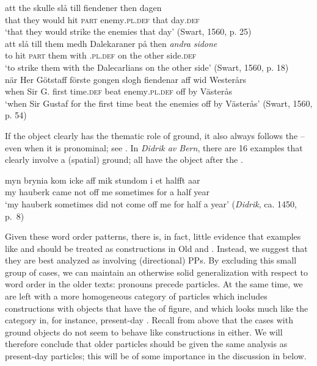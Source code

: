 \documentclass[output=paper]{langscibook}
\begin{document}
\ea\label{ex:lalu:26}
\ea\label{ex:lalu:26a}
\gll  att   the     skulle   slå   till   fiendener         then   dagen\\
    that   they   would   hit  \textsc{part}   enemy\textsc{.pl.def}   that   day\textsc{.def} \\
\glt `that they would strike the enemies that day’ (Swart, 1560, p. 25)\\

\ex\label{ex:lalu:26b}
\gll  att   slå   till   them   medh   Dalekaraner       på   then \textit{andra}   \textit{sidone}\\
    to     hit  \textsc{part}  them   with     \textsc{.pl.def}   on   the other     side.\textsc{def}\\
\glt `to strike them with the Dalecarlians on the other side’ (Swart, 1560, p. 18)\\
\z
\ex\label{ex:lalu:27}
\gll  när    Her  Götstaff   förste    gongen   slogh   fiendenar aff   wid  Westerårs\\
when   Sir  G.       first     time.\textsc{def}   beat     enemy\textsc{.pl.def}  off   by   Västerås\\
\glt `when Sir Gustaf for the first time beat the enemies off by Västerås' (Swart, 1560, p. 54)\\
\z

If the object clearly has the thematic role of ground, it also always follows the  – even when it is pronominal; see . In \textit{Didrik av Bern}, there are 16 examples that clearly involve a (spatial) ground; all have the object after the .


\ea\label{ex:lalu:28}
\gll  myn   brynia   kom   icke   aff   mik   stundom   i     et   halfft  aar\\
my     hauberk     came  not     off   me   sometimes   for   a   half   year \\
\glt `my hauberk sometimes did not come off me for half a year’ (\textit{Didrik}, ca. 1450, p.~8)\\
\z

Given these word order patterns, there is, in fact, little evidence that examples like  and  should be treated as  constructions in Old and . Instead, we suggest that they are best analyzed as involving (directional) PPs. By excluding this small group of cases, we can maintain an otherwise solid generalization with respect to word order in the older texts: pronouns precede particles. At the same time, we are left with a more homogeneous category of particles which includes constructions with objects that have the  of figure, and which looks much like the  category in, for instance, present-day . Recall from  above that the cases with ground objects do not seem to behave like  constructions in  either. We will therefore conclude that older  particles should be given the same analysis as present-day  particles; this will be of some importance in the discussion in  below.
\end{document}
